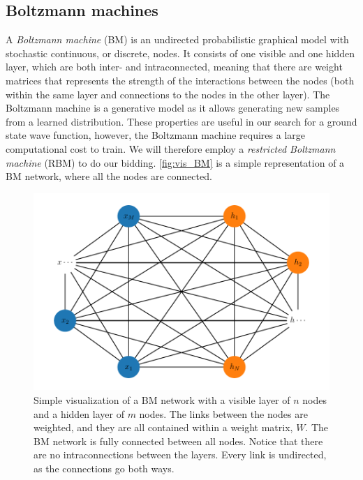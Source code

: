 \subsection{Boltzmann machines}
A \textit{Boltzmann machine} (BM) is an undirected probabilistic graphical model with stochastic continuous, or discrete, nodes. It consists of one visible and one hidden layer, which are both inter- and intraconnected, meaning that there are weight matrices that represents the strength of the interactions between the nodes (both within the same layer and connections to the nodes in the other layer). The Boltzmann machine is a generative model as it allows generating new samples from a learned distribution. These properties are useful in our search for a ground state wave function, however, the Boltzmann machine requires a large computational cost to train. We will therefore employ a \textit{restricted Boltzmann machine} (RBM) to do our bidding.  \autoref{fig:vis_BM} is a simple representation of a BM network, where all the nodes are connected. 

\begin{figure}[H]
\begin{center}\includegraphics[scale=0.8]{latex/latex-report/Images/bm_visualize.pdf}
\end{center}
\caption{Simple visualization of a BM network with a visible layer of $n$ nodes and a hidden layer of $m$ nodes. The links between the nodes are weighted, and they are all contained within a weight matrix, $W$. The BM network is fully connected between all nodes. Notice that there are no intraconnections between the layers. Every link is undirected, as the connections go both ways.}
\label{fig:vis_BM}
\end{figure}

